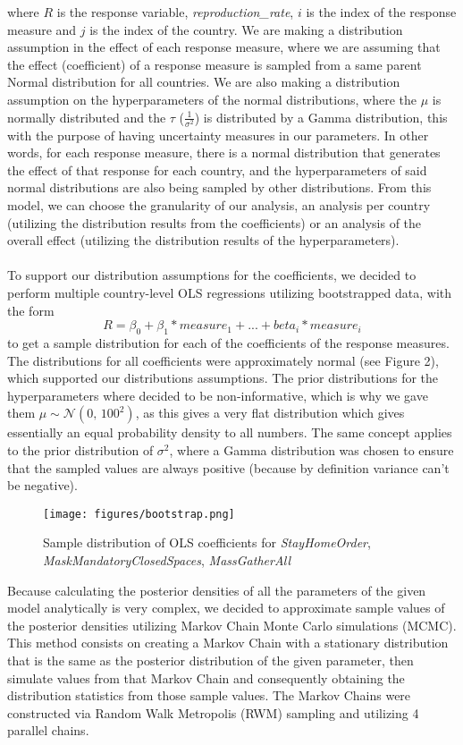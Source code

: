 \documentclass{article}
\begin{document}
where $R$ is the response variable, \textit{reproduction\_rate}, $i$ is the index of the response measure and $j$ is the index of the country. We are making a distribution assumption in the effect of each response measure, where we are assuming that the effect (coefficient) of a response measure is sampled from a same parent Normal distribution for all countries. We are also making a distribution assumption on the hyperparameters of the normal distributions, where the $\mu$ is normally distributed and the $\tau$ ($\frac{1}{\sigma^2}$) is distributed by a Gamma distribution, this with the purpose of having uncertainty measures in our parameters. In other words, for each response measure, there is a normal distribution that generates the effect of that response for each country, and the hyperparameters of said normal distributions are also being sampled by other distributions. From this model, we can choose the granularity of our analysis, an analysis per country (utilizing the distribution results from the coefficients) or an analysis of the overall effect (utilizing the distribution results of the hyperparameters).\\ 
\\
To support our distribution assumptions for the coefficients, we decided to perform multiple country-level OLS regressions utilizing bootstrapped data, with the form 
$$R=\beta_0+\beta_1*measure_1+...+beta_i*measure_i$$
to get a sample distribution for each of the coefficients of the response measures. The distributions for all coefficients were approximately normal (see Figure 2), which supported our distributions assumptions. The prior distributions for the hyperparameters where decided to be non-informative, which is why we gave them $\mu \sim \mathcal{N}(0,\,100^2)$, as this gives a very flat distribution which gives essentially an equal probability density to all numbers. The same concept applies to the prior distribution of $\sigma^2$, where a Gamma distribution was chosen to ensure that the sampled values are always positive (because by definition variance can't be negative).

\begin{figure}[H]
    \centering
    \texttt{[image: figures/bootstrap.png]}%
    \caption{Sample distribution of OLS coefficients for \textit{StayHomeOrder}, \textit{MaskMandatoryClosedSpaces}, \textit{MassGatherAll}}
    \label{fig:heatmap}
\end{figure}

Because calculating the posterior densities of all the parameters of the given model analytically is very complex, we decided to approximate sample values of the posterior densities utilizing Markov Chain Monte Carlo simulations (MCMC)\cite{MCMC}. This method consists on creating a Markov Chain with a stationary distribution that is the same as the posterior distribution of the given parameter, then simulate values from that Markov Chain and consequently obtaining the distribution statistics from those sample values. The Markov Chains were constructed via Random Walk Metropolis (RWM) sampling\cite{Random Walk} and utilizing 4 parallel chains.  
\end{document}
